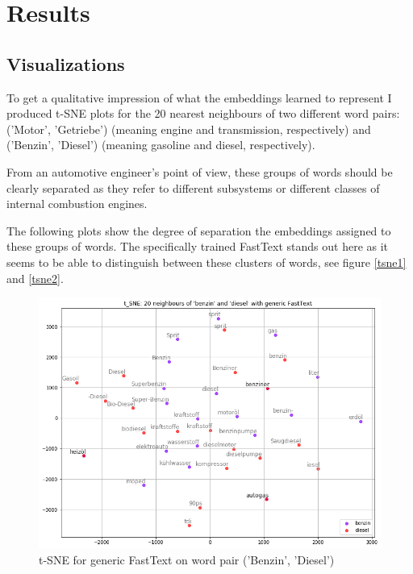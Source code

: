 \documentclass[10pt,a4paper]{article}
\begin{document}
	\section{Results}
	\label{results}
	\subsection{Visualizations}
	To get a qualitative impression of what the embeddings learned to represent I produced t-SNE plots for the 20 nearest neighbours of two different word pairs: ('Motor', 'Getriebe') (meaning engine and transmission, respectively) and ('Benzin', 'Diesel') (meaning gasoline and diesel, respectively). 
	
	From an automotive engineer's point of view, these groups of words should be clearly separated as they refer to different subsystems or different classes of internal combustion engines.
	
	The following plots show the degree of separation the embeddings assigned to these groups of words. The specifically trained FastText stands out here as it seems to be able to distinguish between these clusters of words, see figure \ref{tsne1} and \ref{tsne2}. 
	
\begin{figure}
	\begin{center}
		\includegraphics[scale=0.4]{./Pictures/model_ft_benzin_diesel.png}
		
		\caption{t-SNE for generic FastText on word pair ('Benzin', 'Diesel')}
	\end{center}
\end{figure}
	
\end{document}
